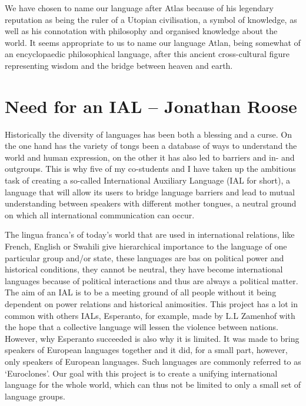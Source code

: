 We have chosen to name our language after Atlas because of his legendary reputation as being the ruler of a Utopian civilisation, a symbol of knowledge, as well as his connotation with philosophy and organised knowledge about the world. It seems appropriate to us to name our language Atlan, being somewhat of an encyclopaedic philosophical language, after this ancient cross-cultural figure representing wisdom and the bridge between heaven \nopagebreak and earth. 


\section{Need for an IAL -- {\small Jonathan Roose}}
Historically the diversity of languages has been both a blessing and a curse. On the one hand has the variety of tongs been a database of ways to understand the world and human expression, on the other it has also led to barriers and in- and outgroups. This is why five of my co-students and I have taken up the ambitious task of creating a so-called International Auxiliary Language (IAL for short), a language that will allow its users to bridge language barriers and lead to mutual understanding between speakers with different mother tongues, a neutral ground on which all international communication can occur. 

The lingua franca’s of today's world that are used in international relations, like French, English or Swahili give hierarchical importance to the language of one particular group and/or state, these languages are bas on political power and historical conditions, they cannot be neutral, they have become international languages because of political interactions and thus are always a political matter. The aim of an IAL is to be a meeting ground of all people without it being dependent on power relations and historical animosities. This project has a lot in common with others IALs, Esperanto, for example, made by L.L Zamenhof with the hope that a collective language will lessen the violence between nations. However, why Esperanto succeeded is also why it is limited. It was made to bring speakers of European languages together and it did, for a small part, however, only speakers of European languages. Such languages are commonly referred to as ‘Euroclones’. Our goal with this project is to create a unifying international language for the whole world, which can thus not be limited to only a small set of language groups. 

